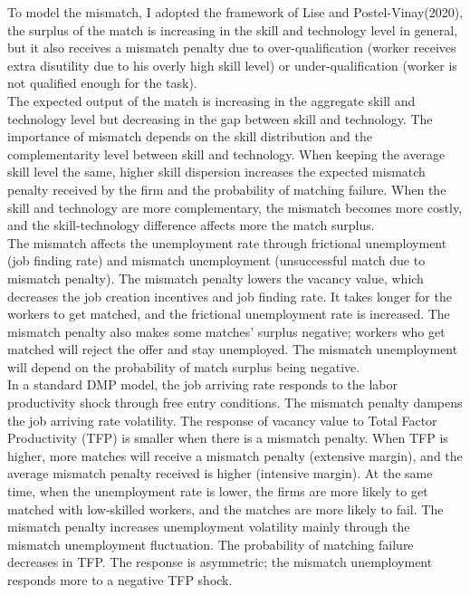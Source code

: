 \documentclass[12pt]{article}
\newcommand{\1}{\mathbb{1}}
\begin{document}
To model the mismatch, I adopted the framework of Lise and Postel-Vinay(2020)\cite{LisePV2020}, the surplus of the match is increasing in the skill and technology level in general, but it also receives a mismatch penalty due to over-qualification (worker receives extra disutility due to his overly high skill level) or under-qualification (worker is not qualified enough for the task). \\

The expected output of the match is increasing in the aggregate skill and technology level but decreasing in the gap between skill and technology. The importance of mismatch depends on the skill distribution and the complementarity level between skill and technology. When keeping the average skill level the same, higher skill dispersion increases the expected mismatch penalty received by the firm and the probability of matching failure. When the skill and technology are more complementary, the mismatch becomes more costly, and the skill-technology difference affects more the match surplus. \\

The mismatch affects the unemployment rate through frictional unemployment (job finding rate) and mismatch unemployment (unsuccessful match due to mismatch penalty). The mismatch penalty lowers the vacancy value, which decreases the job creation incentives and job finding rate. It takes longer for the workers to get matched, and the frictional unemployment rate is increased. The mismatch penalty also makes some matches' surplus negative; workers who get matched will reject the offer and stay unemployed. The mismatch unemployment will depend on the probability of match surplus being negative. \\

In a standard DMP model, the job arriving rate responds to the labor productivity shock through free entry conditions. The mismatch penalty dampens the job arriving rate volatility. The response of vacancy value to Total Factor Productivity (TFP) is smaller when there is a mismatch penalty. When TFP is higher, more matches will receive a mismatch penalty (extensive margin), and the average mismatch penalty received is higher (intensive margin). At the same time, when the unemployment rate is lower, the firms are more likely to get matched with low-skilled workers, and the matches are more likely to fail. The mismatch penalty increases unemployment volatility mainly through the mismatch unemployment fluctuation. The probability of matching failure decreases in TFP. The response is asymmetric; the mismatch unemployment responds more to a negative TFP shock. \\
\end{document}
